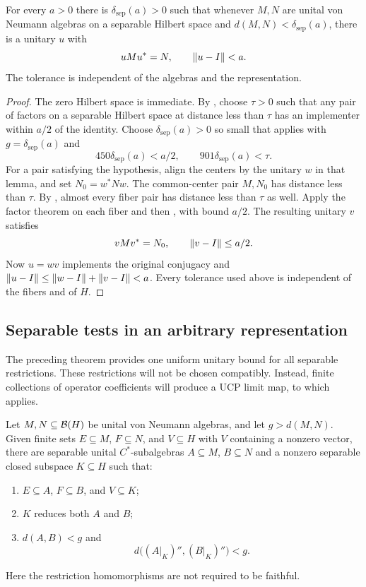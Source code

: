 \begin{theorem}\label{thm:separable-algebras}
For every $a>0$ there is $\delta_{\mathrm{sep}}(a)>0$ such that
whenever $M,N$ are unital von Neumann algebras on a separable Hilbert
space and $d(M,N)<\delta_{\mathrm{sep}}(a)$, there is a unitary $u$
with
\[
 uMu^*=N,\qquad \lVert u-I\rVert<a.
\]
The tolerance is independent of the algebras and the representation.
\end{theorem}

\begin{proof}
The zero Hilbert space is immediate.  By , choose
$\tau>0$ such that any pair of factors on a separable Hilbert space
at distance less than $\tau$ has an implementer within $a/2$ of the
identity.  Choose $\delta_{\mathrm{sep}}(a)>0$ so small that
 applies with $g=\delta_{\mathrm{sep}}(a)$ and
\[
 450\delta_{\mathrm{sep}}(a)<a/2,
 \qquad 901\delta_{\mathrm{sep}}(a)<\tau.
\]
For a pair satisfying the hypothesis, align the centers by the
unitary $w$ in that lemma, and set $N_0=w^*Nw$.  The common-center
pair $M,N_0$ has distance less than $\tau$.  By
, almost every fiber pair has distance less than
$\tau$ as well.  Apply the factor theorem on each fiber and then
, with bound $a/2$.  The resulting
unitary $v$ satisfies
\[
 vMv^*=N_0,\qquad\lVert v-I\rVert\leq a/2.
\]
Now $u=wv$ implements the original conjugacy and
$\lVert u-I\rVert\leq\lVert w-I\rVert+\lVert v-I\rVert<a$.
Every tolerance used above is independent of the fibers and of $H$.
\end{proof}

\subsection{Separable tests in an arbitrary representation}

The preceding theorem provides one uniform unitary bound for all
separable restrictions.  These restrictions will not be chosen
compatibly.  Instead, finite collections of operator coefficients
will produce a UCP limit map, to which  applies.

\begin{lemma}\label{lem:separable-tests}
Let $M,N\subseteq\mathcal B(H)$ be unital von Neumann algebras, and let
$g>d(M,N)$.  Given finite sets $E\subseteq M$, $F\subseteq N$, and
$V\subseteq H$ with $V$ containing a nonzero vector, there are
separable unital $C^*$-subalgebras $A\subseteq M$, $B\subseteq N$
and a nonzero separable closed subspace $K\subseteq H$ such that:
\begin{enumerate}[label=\textup{(\roman*)},leftmargin=*]
 \item $E\subseteq A$, $F\subseteq B$, and $V\subseteq K$;
 \item $K$ reduces both $A$ and $B$;
 \item $d(A,B)<g$ and
 \[
  d\bigl((A|_K)'',(B|_K)''\bigr)<g.
 \]
\end{enumerate}
Here the restriction homomorphisms are not required to be faithful.
\end{lemma}

